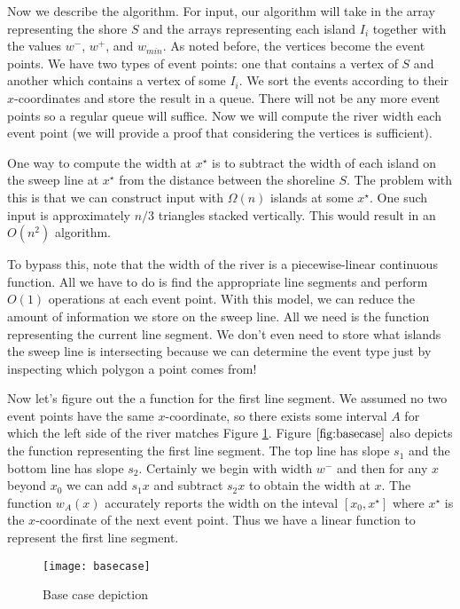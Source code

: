 \documentclass[11pt]{article}
\begin{document}
Now we describe the algorithm.
For input, our algorithm will take in the array representing the shore $S$ and the arrays representing each island $I_i$ together with the values $w^-$, $w^+$, and $w_{min}$.
As noted before, the vertices become the event points.
We have two types of event points: one that contains a vertex of $S$ and another which contains a vertex of some $I_i$.
We sort the events according to their $x$-coordinates and store the result in a queue.
There will not be any more event points so a regular queue will suffice.
Now we will compute the river width each event point (we will provide a proof that considering the vertices is sufficient).

One way to compute the width at $x^\star$ is to subtract the width of each island on the sweep line at $x^\star$ from the distance between the shoreline $S$.
The problem with this is that we can construct input with $\Omega (n)$ islands at some $x^\star$.
One such input is approximately $n/3$ triangles stacked vertically.
This would result in an $O(n^2)$ algorithm.

To bypass this, note that the width of the river is a piecewise-linear continuous function.
All we have to do is find the appropriate line segments and perform $O(1)$ operations at each event point.
With this model, we can reduce the amount of information we store on the sweep line.
All we need is the function representing the current line segment.
We don't even need to store what islands the sweep line is intersecting because we can determine the event type just by inspecting which polygon a point comes from!

Now let's figure out the a function for the first line segment.
We assumed no two event points have the same $x$-coordinate, so there exists some interval $A$ for which the left side of the river matches Figure \ref{fig:basecase}.
Figure $\ref{fig:basecase}$ also depicts the function representing the first line segment.
The top line has slope $s_1$ and the bottom line has slope $s_2$.
Certainly we begin with width $w^-$ and then for any $x$ beyond $x_0$ we can add $s_1 x$ and subtract $s_2 x$ to obtain the width at $x$.
The function $w_A (x)$ accurately reports the width on the inteval $[x_0, x^\star]$ where $x^\star$ is the $x$-coordinate of the next event point.
Thus we have a linear function to represent the first line segment.

\begin{figure}[h]
    \centering
    \texttt{[image: basecase]}
    \caption{Base case depiction}
    \label{fig:basecase}
\end{figure}
\end{document}
